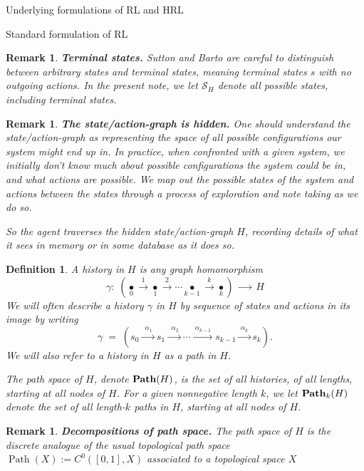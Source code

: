 \documentclass[11pt]{article}
\newtheorem{definition}[subsubsection]{Definition}
\newtheorem{remark}[subsubsection]{Remark}
\newcommand{\Path}{\operatorname{Path}}
\begin{document}
\begin{section}{Underlying formulations of RL and HRL}
\begin{subsection}{Standard formulation of RL}
\begin{remark}
{\bf Terminal states.}
\normalfont
Sutton and Barto are careful to distinguish between arbitrary states and {\em terminal} states, meaning terminal states $s$ with no outgoing actions. In the present note, we let $\mathcal{S}_{H}$ denote {\em all} possible states, including terminal states.
\end{remark}

\begin{remark}
{\bf The state/action-graph is {\em hidden}.}
\normalfont
One should understand the state/action-graph as representing the space of all possible configurations our system might end up in. In practice, when confronted with a given system, we initially don't know much about possible configurations the system could be in, and what actions are possible. We map out the possible states of the system and actions between the states through a process of exploration and note taking as we do so.

So the agent traverses the hidden state/action-graph $H$, recording details of what it sees in memory or in some database as it does so.
\end{remark}

\begin{definition}
\normalfont
A {\em history} in $H$ is any graph homomorphism
$$
\gamma:\;\left(\underset{0}{\bullet}\xrightarrow{\ \ 1\ \ }\underset{1}{\bullet}\xrightarrow{\ \ 2\ \ }\cdots\underset{k-1}{\bullet}\xrightarrow{\ \ k\ \ }\underset{k}{\bullet}\right)
\;\xrightarrow{\ \ \ \ \ \ \ }\;H
$$
We will often describe a history $\gamma$ in $H$ by sequence of states and actions in its image by writing
\begin{equation}\label{eq: general history}
\gamma\;=\;\left(s_{0}\xrightarrow{\ \ \alpha_{1}\ }s_{1}\xrightarrow{\ \ \alpha_{2}\ }\cdots\xrightarrow{\ \alpha_{k-1}\ }s_{k-1}\xrightarrow{\ \alpha_{k}\ }s_{k}\right).
\end{equation}
We will also refer to a history in $H$ as a {\em path} in $H$.

	The {\em path space} of $H$, denote $\bold{Path}(H)$, is the set of all histories, of all lengths, starting at all nodes of $H$. For a given nonnegative length $k$, we let $\bold{Path}_{k}(H)$ denote the set of all length-$k$ paths in $H$, starting at all nodes of $H$.
\end{definition}

\begin{remark}
{\bf Decompositions of path space.}
\normalfont
The path space of $H$ is the discrete analogue of the usual topological path space $\Path(X):=C^0([0,1],X)$ associated to a topological space $X$


\end{remark}
\end{subsection}
\end{section}
\end{document}
